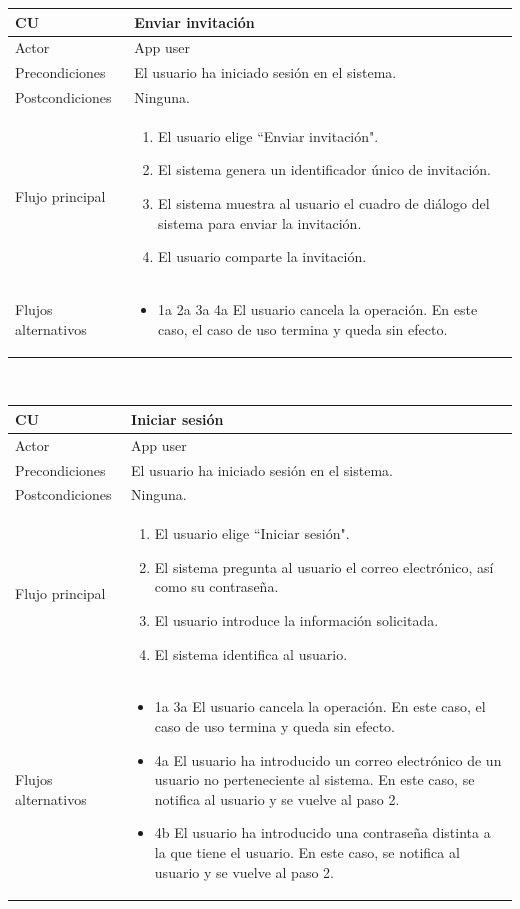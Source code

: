 \documentclass[twoside]{report}
\newcommand\addrow[2]{#1 &#2\\ }
\newcommand\addheading[2]{#1 &#2\\ \hline}
\newcommand\tabularhead{\begin{tabular}{lp{0.7\textwidth}}
\hline
}
\newenvironment{usecase}{\tabularhead}
{\hline\end{tabular}}
\begin{document}
\begin{usecase}
  \addheading{\textbf{CU\arabic{usecase}}}{Enviar invitación} 
  \addrow{Actor}{App user}
  \addrow{Precondiciones}{El usuario ha iniciado sesión en el sistema.}
  \addrow{Postcondiciones}{Ninguna.}
  \addrow{Flujo principal}{
  		\begin{enumerate}
  		\item El usuario elige “Enviar invitación".
  		\item El sistema genera un identificador único de invitación.
  		\item El sistema muestra al usuario el cuadro de diálogo del sistema para enviar la invitación.
  		\item El usuario comparte la invitación.
  		\end{enumerate}
  }
  \addrow{Flujos alternativos}{
  		\begin{itemize}
  		\item 1a 2a 3a 4a El usuario cancela la operación. En este caso, el caso de uso termina y queda sin efecto.
  		\end{itemize}
  }
\end{usecase}\\

\begin{usecase}
  \addheading{\textbf{CU\arabic{usecase}}}{Iniciar sesión} 
  \addrow{Actor}{App user}
  \addrow{Precondiciones}{El usuario ha iniciado sesión en el sistema.}
  \addrow{Postcondiciones}{Ninguna.}
  \addrow{Flujo principal}{
  		\begin{enumerate}
  		\item El usuario elige “Iniciar sesión". %
  		\item El sistema pregunta al usuario el correo electrónico, así como su contraseña. %
  		\item El usuario introduce la información solicitada. %
  		\item El sistema identifica al usuario. %
  		\end{enumerate}
  }
  \addrow{Flujos alternativos}{
  		\begin{itemize}
  		\item 1a 3a El usuario cancela la operación. En este caso, el caso de uso termina y queda sin efecto.
  		\item 4a El usuario ha introducido un correo electrónico de un usuario no perteneciente al sistema. En este caso, se notifica al usuario y se vuelve al paso 2.
  		\item 4b El usuario ha introducido una contraseña distinta a la que tiene el usuario. En este caso, se notifica al usuario y se vuelve al paso 2.
  		\end{itemize}
  }
\end{usecase}\\
\end{document}
